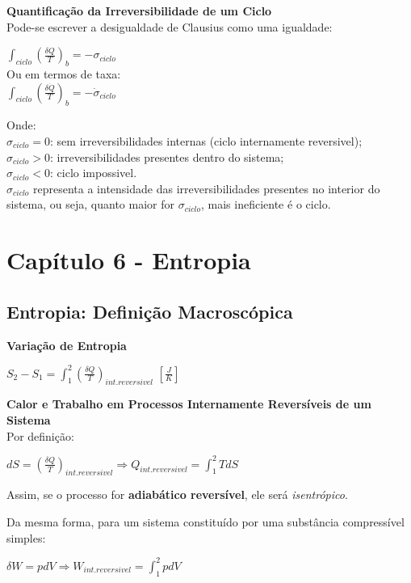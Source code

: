\documentclass[a4paper, 12pt]{article}
\begin{document}
\textbf{Quantificação da Irreversibilidade de um Ciclo}\\
Pode-se escrever a desigualdade de Clausius como uma igualdade:
	\begin{center}
		\large
		$ \int_{ciclo} (\frac{\delta Q}{T})_b = -\sigma_{ciclo}$\\
		Ou em termos de taxa:\\
		$ \int_{ciclo} (\frac{\delta \dot{Q}}{T})_b = -\dot{\sigma}_{ciclo}$
	\end{center}
	Onde:\\
	$ \sigma_{ciclo} = 0 $: sem irreversibilidades internas (ciclo internamente reversivel);\\
	$ \sigma_{ciclo} > 0 $: irreversibilidades presentes dentro do sistema;	\\
	$ \sigma_{ciclo} < 0 $: ciclo impossivel.\\
	
	$ \sigma_{ciclo} $ representa a intensidade das irreversibilidades presentes no interior do sistema,	ou seja, quanto maior for $ \sigma_{ciclo} $, mais ineficiente é o ciclo.
	

\newpage
\section{Capítulo 6 - Entropia}
\subsection{Entropia: Definição Macroscópica}
\textbf{Variação de Entropia}
	\begin{center}
		\large
		$ S_2 - S_1 = \int_{1}^2 (\frac{\delta Q}{T})_{int. reversivel} $  $ [\frac{J}{K}] $ 
	\end{center}

\textbf{Calor e Trabalho em Processos Internamente
	Reversíveis de um Sistema}\\

Por definição:
	\begin{center}
		\large
		$ dS = (\frac{\delta Q}{T})_{int. reversivel} \Rightarrow
		Q_{int.reversivel} = \int^2_{1}TdS $
	\end{center}
Assim, se o processo for \textbf{adiabático reversível}, ele será \textit{isentrópico}.

Da mesma forma, para um sistema constituído por uma substância
compressível simples:
	\begin{center}
		\large
		$ \delta W = pdV \Rightarrow 
		W_{int.reversivel} = \int^2_1 pdV $
	\end{center}
\end{document}
